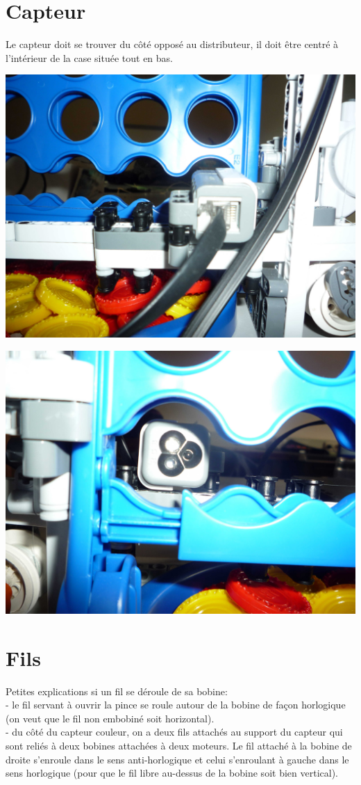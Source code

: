\documentclass[12pt]{report}
\begin{document}
\section{Capteur}
Le capteur doit se trouver du côté opposé au distributeur, il doit être
centré à l'intérieur de la case située tout en bas.

\begin{center}
		\includegraphics[width=0.7\linewidth]{images/Capteur.JPG}
\end{center}

\begin{center}
	\includegraphics[width=0.7\linewidth]{images/Capteur1.JPG}
\end{center}

\section{Fils}
Petites explications si un fil se déroule de sa bobine:\\
- le fil servant à ouvrir la pince se roule autour de la bobine de façon
 horlogique (on veut que le fil non embobiné soit horizontal).\\
- du côté du capteur couleur, on a deux fils attachés au support du capteur qui
 sont reliés à deux bobines attachées à deux moteurs. Le fil attaché à la bobine
 de droite s'enroule dans le sens anti-horlogique et celui s'enroulant à gauche
 dans le sens horlogique (pour que le fil libre au-dessus de la bobine soit
 bien vertical).
\end{document}
